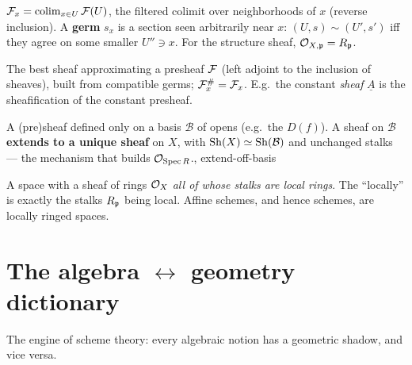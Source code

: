 \begin{defbox}
$\mathcal{F}_x=\operatorname*{colim}_{x\in U}\mathcal{F}(U)$, the filtered colimit over neighborhoods of $x$ (reverse
inclusion). A \textbf{germ} $s_x$ is a section seen arbitrarily near $x$:
$(U,s)\sim(U',s')$ iff they agree on some smaller $U''\ni x$. For the structure sheaf,
$\mathcal{O}_{X,\mathfrak{p}}=R_{\mathfrak{p}}$.\hfill{}
\end{defbox}

\begin{defbox}[Sheafification $\sF^{\#}$]
The best sheaf approximating a presheaf $\mathcal{F}$ (left adjoint to the inclusion of sheaves), built
from compatible germs; $\mathcal{F}^{\#}_x=\mathcal{F}_x$. E.g.\ the constant \emph{sheaf} $\underline A$ is the
sheafification of the constant presheaf.\hfill{}
\end{defbox}

\begin{defbox}
A (pre)sheaf defined only on a basis $\mathcal B$ of opens (e.g.\ the $D(f)$). A sheaf on
$\mathcal B$ \textbf{extends to a unique sheaf} on $X$, with $\operatorname{Sh}(X)\simeq\operatorname{Sh}(\mathcal B)$ and
unchanged stalks --- the mechanism that builds $\mathcal{O}_{\operatorname{Spec} R}$.\hfill{}, extend-off-basis 
\end{defbox}

\begin{defbox}
A space with a sheaf of rings $\mathcal{O}_X$ \emph{all of whose stalks are local rings}. The ``locally''
is exactly the stalks $R_{\mathfrak{p}}$ being local. Affine schemes, and hence schemes, are locally
ringed spaces.\hfill{}
\end{defbox}

\section{The algebra \texorpdfstring{$\leftrightarrow$}{<->} geometry dictionary}

The engine of scheme theory: every algebraic notion has a geometric shadow, and vice versa.


